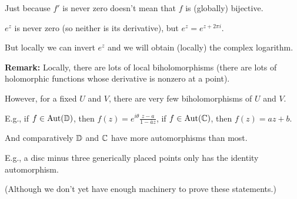 \documentclass[10pt,aspectratio=169]{beamer}
\begin{document}
\begin{frame}
Just because $f'$ is never zero doesn't mean that 
$f$ is (globally) bijective.

\medskip
\pause

$e^z$ is never zero (so neither is its derivative),
but $e^{z} = e^{z+2\pi i}$.

\medskip
\pause

But locally we can invert $e^z$ and we will obtain
(locally) the complex logarithm.

\medskip
\pause

\textbf{Remark:}
Locally, there are lots of local biholomorphisms
(there are lots of holomorphic functions whose derivative is nonzero at a point).

\medskip
\pause

However, for a fixed $U$ and $V$, there are very few biholomorphisms of $U$
and $V$.

\medskip
\pause

E.g., if $f \in \operatorname{Aut}({\mathbb{D}})$, then $f(z) = e^{i\theta} \frac{z-a}{1-\bar{a}z}$,
\pause
if $f \in \operatorname{Aut}({\mathbb{C}})$, then $f(z) = a z + b$.

\medskip
\pause

And comparatively ${\mathbb{D}}$ and ${\mathbb{C}}$ have more automorphisms
than most. 

\medskip
\pause

E.g., a disc minus three generically placed points only has the identity 
automorphism.

\medskip
\pause

(Although we don't yet have enough machinery to prove these statements.)
\end{frame}
\end{document}
